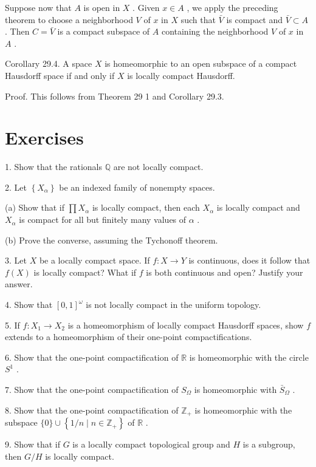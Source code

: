 Suppose now that \(A\) is open in \(X\) . Given \(x \in  A\) , we apply the preceding theorem to choose a neighborhood \(V\) of \(x\) in \(X\) such that \(\bar{V}\) is compact and \(\bar{V} \subset  A\) . Then \(C = \bar{V}\) is a compact subspace of \(A\) containing the neighborhood \(V\) of \(x\) in \(A\) .

Corollary 29.4. A space \(X\) is homeomorphic to an open subspace of a compact Hausdorff space if and only if \(X\) is locally compact Hausdorff.

Proof. This follows from Theorem 29 1 and Corollary 29.3.

\section*{Exercises}

1. Show that the rationals \(\mathbb{Q}\) are not locally compact.

2. Let \(\left\{  {X}_{\alpha }\right\}\) be an indexed family of nonempty spaces.

(a) Show that if \(\prod {X}_{\alpha }\) is locally compact, then each \({X}_{\alpha }\) is locally compact and \({X}_{\alpha }\) is compact for all but finitely many values of \(\alpha\) .

(b) Prove the converse, assuming the Tychonoff theorem.

3. Let \(X\) be a locally compact space. If \(f : X \rightarrow  Y\) is continuous, does it follow that \(f\left( X\right)\) is locally compact? What if \(f\) is both continuous and open? Justify your answer.

4. Show that \({\left\lbrack  0,1\right\rbrack  }^{\omega }\) is not locally compact in the uniform topology.

5. If \(f : {X}_{1} \rightarrow  {X}_{2}\) is a homeomorphism of locally compact Hausdorff spaces, show \(f\) extends to a homeomorphism of their one-point compactifications.

6. Show that the one-point compactification of \(\mathbb{R}\) is homeomorphic with the circle \({S}^{1}\) .

7. Show that the one-point compactification of \({S}_{\Omega }\) is homeomorphic with \({\bar{S}}_{\Omega }\) .

8. Show that the one-point compactification of \({\mathbb{Z}}_{ + }\) is homeomorphic with the subspace \(\{ 0\}  \cup  \left\{  {1/n \mid  n \in  {\mathbb{Z}}_{ + }}\right\}\) of \(\mathbb{R}\) .

9. Show that if \(G\) is a locally compact topological group and \(H\) is a subgroup, then \(G/H\) is locally compact.

